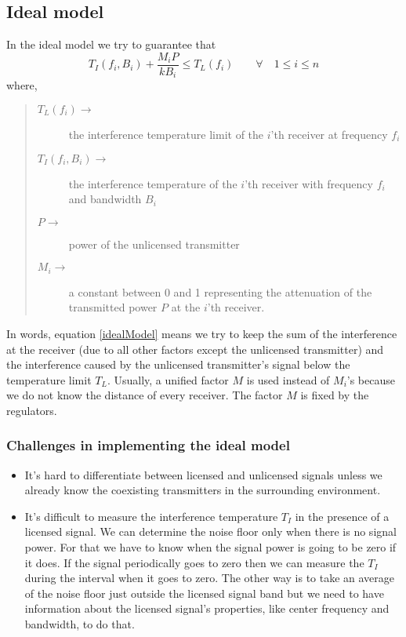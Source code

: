 \documentclass[12pt]{article}
\begin{document}
\subsection{Ideal model}

In the ideal model we try to guarantee that
\begin{equation}
    T_I(f_i,B_i) + \frac{M_iP}{kB_i} \leq T_L(f_i) \qquad \forall \quad 1 \leq i \leq n \label{idealModel}
\end{equation}
where,
\begin{quote}
\begin{description}
    \item[$T_L(f_i)\longrightarrow$] the interference temperature limit of the $i$'th receiver at frequency $f_i$
    \item[$T_I(f_i,B_i)\longrightarrow$] the interference temperature of the $i$'th receiver with frequency $f_i$ and bandwidth $B_i$
    \item[$P\longrightarrow$] power of the unlicensed transmitter
    \item[$M_i\longrightarrow$] a constant between 0 and 1 representing the attenuation of the  transmitted power $P$ at the $i$'th receiver.
\end{description}
\end{quote}

In words, equation \eqref{idealModel} means we try to keep the sum of the interference at the receiver (due to all other factors except the unlicensed transmitter) and the interference caused by the unlicensed transmitter's signal below the temperature limit $T_L$. Usually, a unified factor $M$ is used instead of $M_i$'s because we do not know the distance of every receiver. The factor $M$ is fixed by the regulators.

\subsubsection*{Challenges in implementing the ideal model}

\begin{itemize}
    \item It's hard to differentiate between licensed and unlicensed signals unless we already know the coexisting transmitters in the surrounding environment.
    \item It's difficult to measure the interference temperature $T_I$ in the presence of a licensed signal. We can determine the noise floor only when there is no signal power. For that we have to know when the signal power is going to be zero if it does. If the signal periodically goes to zero then we can measure the $T_I$ during the interval when it goes to zero. The other way is to take an average of the noise floor just outside the licensed signal band but we need to have information about the licensed signal's properties, like center frequency and bandwidth, to do that.
\end{itemize}
\end{document}
